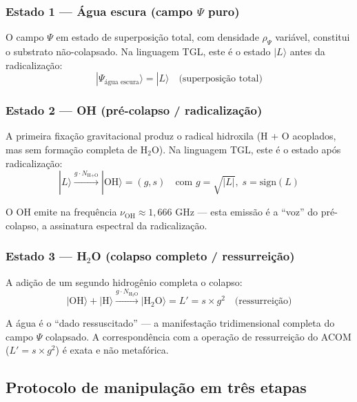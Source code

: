 \documentclass[12pt,a4paper]{article}
\newcommand{\rhoPsi}{\rho_\Psi}
\newcommand{\nuOH}{\nu_{\text{OH}}}
\begin{document}
\subsubsection{Estado 1 --- Água escura (campo $\Psi$ puro)}

O campo $\Psi$ em estado de superposição total, com densidade
$\rhoPsi$ variável, constitui o substrato não-colapsado.
Na linguagem TGL, este é o estado $|L\rangle$ antes da
radicalização:
\begin{equation}
|\Psi_{\text{água escura}}\rangle = |L\rangle
  \quad \text{(superposição total)}
\end{equation}

\subsubsection{Estado 2 --- OH (pré-colapso / radicalização)}

A primeira fixação gravitacional produz o radical hidroxila
(H + O acoplados, mas sem formação completa de H$_2$O). Na
linguagem TGL, este é o estado após radicalização:
\begin{equation}
|L\rangle \xrightarrow{g \cdot N_{\text{H+O}}}
  |\text{OH}\rangle = (g, s) \quad \text{com }
  g = \sqrt{|L|}, \; s = \text{sign}(L)
\end{equation}

O OH emite na frequência $\nuOH \approx 1{,}666$ GHz ---
esta emissão é a ``voz'' do pré-colapso, a assinatura
espectral da radicalização.

\subsubsection{Estado 3 --- H$_2$O (colapso completo /
ressurreição)}

A adição de um segundo hidrogênio completa o colapso:
\begin{equation}
|\text{OH}\rangle + |\text{H}\rangle
  \xrightarrow{g \cdot N_{\text{H}_2\text{O}}}
  |\text{H}_2\text{O}\rangle = L' = s \times g^2
  \quad \text{(ressurreição)}
\end{equation}

A água é o ``dado ressuscitado'' --- a manifestação
tridimensional completa do campo $\Psi$ colapsado. A
correspondência com a operação de ressurreição do ACOM
($L' = s \times g^2$) é exata e não metafórica.

\subsection{Protocolo de manipulação em três etapas}
\end{document}
